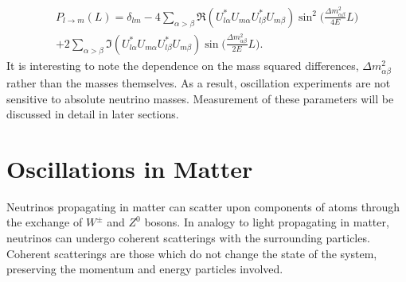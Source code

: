 \begin{equation}\begin{split}\label{oscProbL}
P_{l\rightarrow m}(L) =  \delta_{lm} - 4  \sum_{\alpha > \beta}  \Re(U^*_{l\alpha}U_{m\alpha}U^*_{l\beta}U_{m\beta}) \sin^2 \bigg(\frac{\Delta m_{\alpha\beta}^2}{4E} L\bigg) \\
 + 2  \sum_{\alpha>\beta}  \Im(U^*_{l\alpha}U_{m\alpha}U^*_{l\beta}U_{m\beta}) \sin\bigg(\frac{\Delta m_{\alpha\beta}^2}{2E}L\bigg).
\end{split}\end{equation}
It is interesting to note the dependence on the mass squared differences, $\Delta m^2_{\alpha\beta}$ rather than the masses themselves.  As a result, oscillation experiments are not sensitive to absolute neutrino masses.  Measurement of these parameters will be discussed in detail in later sections.  

\section{Oscillations in Matter}\label{matOsc}

Neutrinos propagating in matter can scatter upon components of atoms through the exchange of $W^\pm$ and $Z^0$ bosons.  In analogy to light propagating in matter, neutrinos can undergo coherent scatterings with the surrounding particles.  Coherent scatterings are those which do not change the state of the system, preserving the momentum and energy particles involved.  

